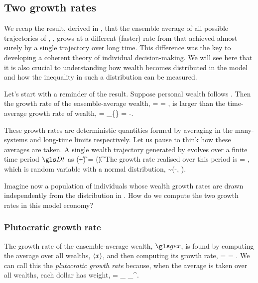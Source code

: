 
\subsection{Two growth rates}
We recap the result, derived in , that the ensemble average of all possible trajectories of \GBM, , grows at a different (faster) rate from that achieved almost surely by a single trajectory over long time. This difference was the key to developing a coherent theory of individual decision-making. We will see here that it is also crucial to understanding how wealth becomes distributed in the \GBM model and how the inequality in such a distribution can be measured.

Let's start with a reminder of the result. Suppose personal wealth follows . Then the growth rate of the ensemble-average wealth,
\be
\gex = \frac{\D\ln\ave{\x}}{\Dt} = \gmu,
\ee
is larger than the time-average growth rate of wealth,
\be
\gt = \lim_{\Dt\to\infty}\left\{\frac{\D\ln \x}{\Dt}\right\} = \gmu-.
\ee

These growth rates are deterministic quantities formed by averaging in the many-systems and long-time limits respectively. Let us pause to think how these averages are taken. A single wealth trajectory generated by  evolves over a finite time period $\Dt$ as
\be
\x(\t+\Dt) = \x(\t)\exp{}.
\ee
The growth rate realised over this period is
\be
\g = \frac{\D\ln\x}{\Dt},
\ee
which is random variable with a normal distribution,
\be
\g  \sim \N\left(\gmu-, \right).
\ee

Imagine now a population of individuals whose wealth growth rates are drawn independently from the distribution in . How do we compute the two growth rates in this model economy?

\subsubsection{Plutocratic growth rate}
The growth rate of the ensemble-average wealth, $\gex$, is found by computing the average over all wealths, $\left\langle x\right\rangle$, and then computing its growth rate,
\be
\gex = \frac{\D\ln\ave{\x}}{\Dt} = \gmu.
\ee
We can call this the \textit{plutocratic growth rate} because, when the average is taken over all wealths, each dollar has weight,
\be
{} = \lim_{\N\to\infty} \sum_{}^\N \frac{\x_\gi}{\N}.
\ee
 

